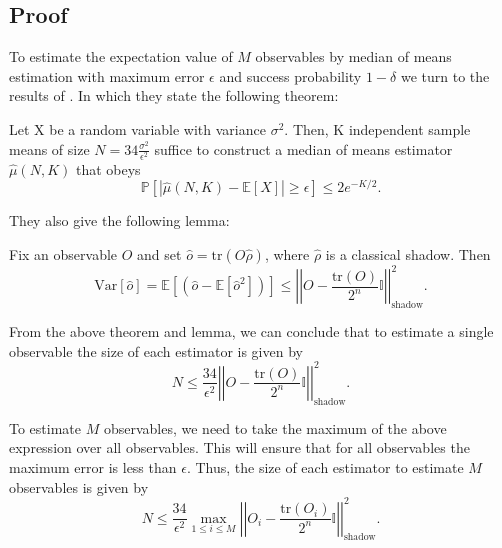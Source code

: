 \documentclass[12pt]{article}
\begin{document}
    \subsection{Proof}
    To estimate the expectation value of $M$ observables by median of means estimation with maximum error $\epsilon$ and success probability $1-\delta$ we turn to the results of \cite{Huang_Kueng_Preskill_2020}. In which they state the following theorem:
    \begin{theorem}
        Let X be a random variable with variance $\sigma^2$. Then, K independent sample means of size $N = 34 \frac{\sigma^2}{\epsilon^2}$ suffice to construct a median of means estimator $\hat{\mu}(N, K)$ that obeys 
        \begin{equation}
            \mathbb{P}[|\hat{\mu}(N, K) - \mathbb{E}[X]| \geq \epsilon] \leq 2e^{-K/2}.
        \end{equation}
    \end{theorem}

    They also give the following lemma:
    \begin{lemma}
        Fix an observable $O$ and set $\hat{o} = \text{tr}(O\hat{\rho})$, where $\hat{\rho}$ is a classical shadow. Then
        \begin{equation}
            \text{Var}[\hat{o}] = \mathbb{E}\left[(\hat{o}-\mathbb{E}[\hat{o}^2])\right] \leq \left|\left| O - \frac{\text{tr}(O)}{2^n} \mathbb{I} \right|\right|^2_\text{shadow}.
        \end{equation}
    \end{lemma}

    From the above theorem and lemma, we can conclude that to estimate a single observable the size of each estimator is given by 
    \begin{equation}
        N \leq \frac{34}{\epsilon^2}\left|\left| O - \frac{\text{tr}(O)}{2^n} \mathbb{I} \right|\right|^2_\text{shadow}.
    \end{equation}

    To estimate $M$ observables, we need to take the maximum of the above expression over all observables. This will ensure that for all observables the maximum error is less than $\epsilon$. Thus, the size of each estimator to estimate $M$ observables is given by
    \begin{equation}
        N \leq \frac{34}{\epsilon^2} \max_{1\leq i \leq M} \left|\left| O_i - \frac{\text{tr}(O_i)}{2^n} \mathbb{I} \right|\right|^2_\text{shadow}.
    \end{equation}
\end{document}
